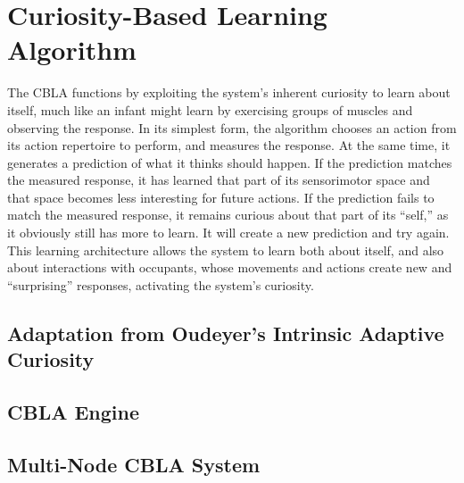 \chapter{Curiosity-Based Learning Algorithm} \label{chap:cbla}
 The CBLA functions by exploiting the system’s inherent curiosity to learn about itself, much like an infant might learn by exercising groups of muscles and observing the response.  In its simplest form, the algorithm chooses an action from its action repertoire to perform, and measures the response.  At the same time, it generates a prediction of what it thinks should happen.  If the prediction matches the measured response, it has learned that part of its sensorimotor space and that space becomes less interesting for future actions.  If the prediction fails to match the measured response, it remains curious about that part of its “self,” as it obviously still has more to learn.  It will create a new prediction and try again.  This learning architecture allows the system to learn both about itself, and also about interactions with occupants, whose movements and actions create new and “surprising” responses, activating the system’s curiosity.

\section{Adaptation from Oudeyer’s Intrinsic Adaptive Curiosity}

\section{CBLA Engine}

\section{Multi-Node CBLA System}


